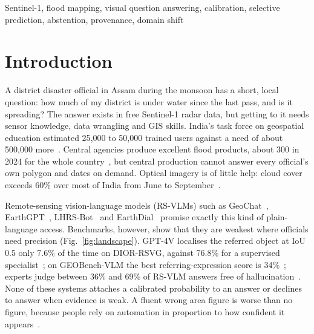 \documentclass[conference]{IEEEtran}
\begin{document}
\begin{IEEEkeywords}
Sentinel-1, flood mapping, visual question answering, calibration, selective prediction, abstention, provenance, domain shift
\end{IEEEkeywords}

\section{Introduction}

A district disaster official in Assam during the monsoon has a short, local question: how much of my district is under water since the last pass, and is it spreading? The answer exists in free Sentinel-1 radar data, but getting to it needs sensor knowledge, data wrangling and GIS skills. India's task force on geospatial education estimated 25{,}000 to 50{,}000 trained users against a need of about 500{,}000 more~\cite{ntfge2013}. Central agencies produce excellent flood products, about 300 in 2024 for the whole country~\cite{india2025copuos,nrsc2023atlas}, but central production cannot answer every official's own polygon and dates on demand. Optical imagery is of little help: cloud cover exceeds 60\% over most of India from June to September~\cite{shang2018monsoon}.

Remote-sensing vision-language models (RS-VLMs) such as GeoChat~\cite{kuckreja2024geochat}, EarthGPT~\cite{zhang2024earthgpt}, LHRS-Bot~\cite{muhtar2024lhrsbot} and EarthDial~\cite{soni2025earthdial} promise exactly this kind of plain-language access. Benchmarks, however, show that they are weakest where officials need precision (Fig.~\ref{fig:landscape}). GPT-4V localises the referred object at IoU 0.5 only 7.6\% of the time on DIOR-RSVG, against 76.8\% for a supervised specialist~\cite{zhang2024vleo}; on GEOBench-VLM the best referring-expression score is 34\%~\cite{danish2025geobench}; experts judge between 36\% and 69\% of RS-VLM answers free of hallucination~\cite{zhou2026rshallu}. None of these systems attaches a calibrated probability to an answer or declines to answer when evidence is weak. A fluent wrong area figure is worse than no figure, because people rely on automation in proportion to how confident it appears~\cite{lee2004trust}.
\end{document}
